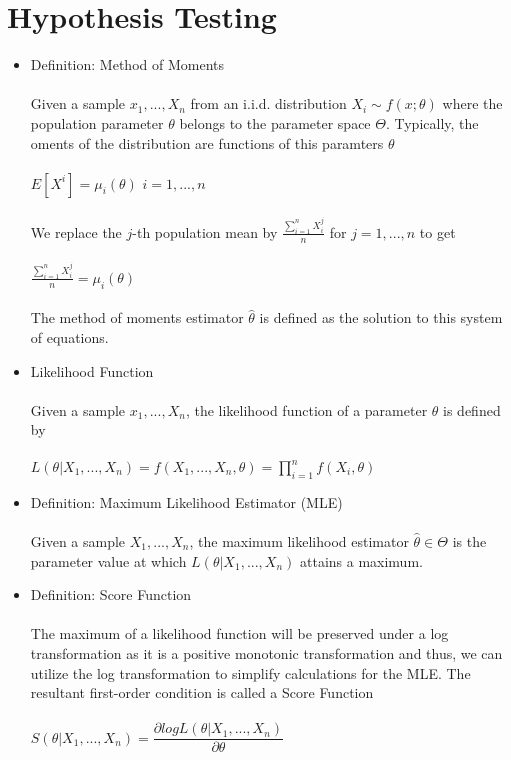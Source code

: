 \documentclass{article}
\begin{document}
\section{Hypothesis Testing}
\begin{itemize}
    \item Definition: Method of Moments\\\\
    Given a sample $x_1,...,X_n$ from an i.i.d. distribution $X_i\sim f(x;\theta)$ where the population parameter $\theta$ belongs to the parameter space $\Theta$.  Typically, the  oments of the distribution are functions of this paramters $\theta$\\\\
    $E[X^i]=\mu_i(\theta)$ $i=1,...,n$\\\\
    We replace the $j$-th population mean by $\frac{\sum_{i=1}^nX_i^j}{n}$ for $j=1,...,n$ to get \\\\
    $\frac{\sum_{i=1}^nX_i^j}{n}=\mu_i(\theta)$\\\\
    The method of moments estimator $\hat{\theta}$ is defined as the solution to this system of equations.
    \item Likelihood Function\\\\
    Given a sample $x_1,...,X_n$, the likelihood function of a parameter $\theta$ is defined by\\\\
    $L(\theta|X_1,...,X_n)=f(X_1,...,X_n,\theta)=\prod_{i=1}^nf(X_i,\theta)$
    \item Definition: Maximum Likelihood Estimator (MLE)\\\\
    Given a sample $X_1,...,X_n$, the maximum likelihood estimator $\hat{\theta}\in\Theta$ is the parameter value at which $L(\theta|X_1,...,X_n)$ attains a maximum.
    \item Definition: Score Function\\\\
    The maximum of a likelihood function will be preserved under a log transformation as it is a positive monotonic transformation and thus, we can utilize the log transformation to simplify calculations for the MLE.  The resultant first-order condition is called a Score Function\\\\
    $S(\theta|X_1,...,X_n)=\dfrac{\partial logL(\theta|X_1,...,X_n)}{\partial\theta}$

\end{itemize}
\end{document}
